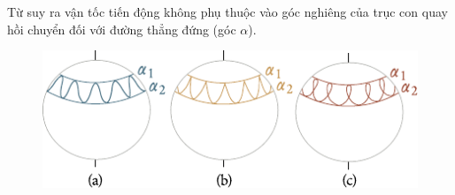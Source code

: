 \noindent
Từ  suy ra vận tốc tiến động không phụ thuộc vào góc nghiêng của trục con quay hồi chuyển đối với đường thẳng đứng (góc $\alpha$).

\begin{figure}[!htb]
	\begin{center}
		\includegraphics[scale=0.95]{figures/ch_05/fig_5_30.pdf}
		\caption[]{}
		\label{fig:5_30}
	\end{center}
\end{figure}

